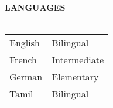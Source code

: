 \documentclass[11pt, a4paper]{article}
\newcommand{\lineunder} {
    \vspace*{-8pt} \\
    \hspace*{-18pt} \hrulefill \\
}
\newcommand{\header} [1] {
    {\hspace*{-18pt}\vspace*{6pt} \textsc{#1}}
    \vspace*{-6pt} \lineunder
}
\begin{document}
\vspace{5mm}



\header{\textbf{LANGUAGES}}
\vspace{1mm}
\renewcommand{\arraystretch}{1.5}
\begin{tabular}{ p{3cm}p{3cm} }
English   &Bilingual  \\
French   &Intermediate \\
German &Elementary \\
Tamil &Bilingual \\
\end{tabular}


\end{document}
